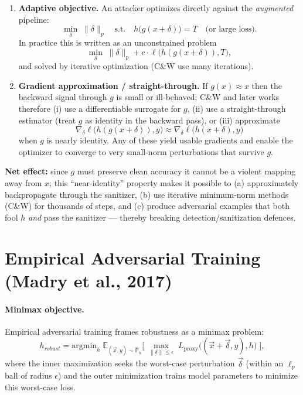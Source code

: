 \documentclass[11pt]{report}
\begin{document}
\begin{enumerate}
  \item \textbf{Adaptive objective.}  An attacker optimizes directly against the \emph{augmented} pipeline:
  \[
    \min_{\delta}\; \|\delta\|_p \quad\text{s.t.}\quad h\big(g(x+\delta)\big)=T \quad\text{(or large loss)}.
  \]
  In practice this is written as an unconstrained problem
  \[
    \min_{\delta}\; \|\delta\|_p + c\cdot \ell\big(h(g(x+\delta)),T\big),
  \]
  and solved by iterative optimization (C\&W use many iterations).
  \item \textbf{Gradient approximation / straight-through.} If \(g(x)\approx x\) then the backward signal through \(g\) is small or ill-behaved; C\&W and later works therefore (i) use a differentiable surrogate for \(g\), (ii) use a straight-through estimator (treat \(g\) as identity in the backward pass), or (iii) approximate
  \[
    \nabla_\delta \ell\big(h(g(x+\delta)),y\big)
    \approx
    \nabla_\delta \ell\big(h(x+\delta),y\big)
  \]
  when \(g\) is nearly identity.  Any of these yield usable gradients and enable the optimizer to converge to very small-norm perturbations that survive \(g\).
\end{enumerate}

\noindent\textbf{Net effect:} since \(g\) must preserve clean accuracy it cannot be a violent mapping away from \(x\); this ``near-identity'' property makes it possible to (a) approximately backpropagate through the sanitizer, (b) use iterative minimum-norm methods (C\&W) for thousands of steps, and (c) produce adversarial examples that both fool \(h\) \emph{and} pass the sanitizer — thereby breaking detection/sanitization defences.


\section{Empirical Adversarial Training (Madry et al., 2017)}

\paragraph{Minimax objective.}
Empirical adversarial training frames robustness as a minimax problem:
\begin{equation}\label{eq:adv-train}
h_{robust} = \text{argmin}_{h}\; \mathbb{E}_{(\vec{x},y)\sim\mathbb{\hat{P}}_n}\Big[ \; \max_{\|\delta\| \le \epsilon} \; L_\text{proxy}\big((\vec{x}+\vec{\delta}, y),h\big) \;\Big],
\end{equation}
where the inner maximization seeks the worst-case perturbation \(\vec{\delta}\) (within an \(\ell_p\) ball of radius \(\epsilon\)) and the outer minimization trains model parameters to minimize this worst-case loss.
\end{document}
